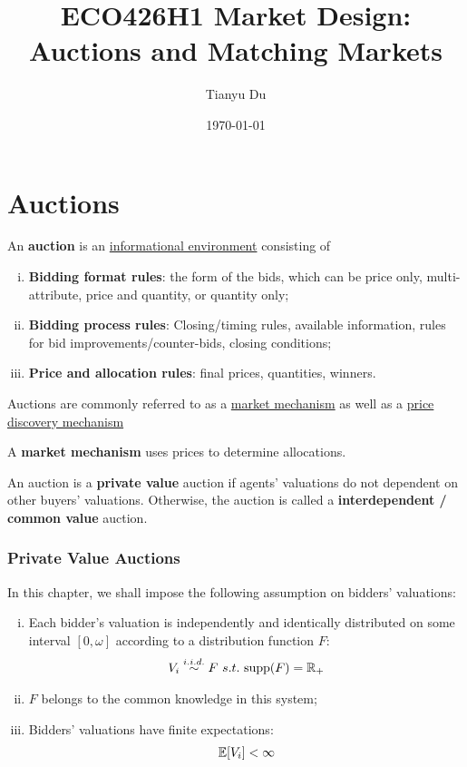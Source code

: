 \documentclass{book}
\title{ECO426H1 Market Design: Auctions and Matching Markets}
\author{Tianyu Du}
\date{\today}
\begin{document}
	\maketitle
	\tableofcontents
	
	\newpage
	
	\chapter{Auctions}
	\begin{definition}
		An \textbf{auction} is an \ul{informational environment} consisting of
		\begin{enumerate}[(i)]
			\item \textbf{Bidding format rules}: the form of the bids, which can be price only, multi-attribute, price and quantity, or quantity only;
			\item \textbf{Bidding process rules}: Closing/timing rules, available information, rules for bid improvements/counter-bids, closing conditions;
			\item \textbf{Price and allocation rules}: final prices, quantities, winners.
		\end{enumerate}
		Auctions are commonly referred to as a \ul{market mechanism} as well as a \ul{price discovery mechanism}
	\end{definition}
	
	\begin{definition}
		A \textbf{market mechanism} uses prices to determine allocations.
	\end{definition}

	\begin{definition}
		An auction is a \textbf{private value} auction if agents' valuations do not dependent on other buyers' valuations. Otherwise, the auction is called a \textbf{interdependent / common value} auction.
	\end{definition}
	
	\subsection{Private Value Auctions}
	
	\begin{assumption}
		In this chapter, we shall impose the following assumption on bidders' valuations:
		\begin{enumerate}[(i)]
			\item Each bidder's valuation is independently and identically distributed on some interval $[0, \omega]$ according to a distribution function $F$:
			\begin{align}
				V_i \overset{i.i.d.}{\sim} F\ s.t.\ \text{{supp}}(F) = \mathbb{R}_+
			\end{align}
			\item $F$ belongs to the common knowledge in this system;
			\item Bidders' valuations have finite expectations:
			\begin{align}
				\mathbb{E}[{V_i}] < \infty
			\end{align}
		\end{enumerate}
	\end{assumption}
	
\end{document}
